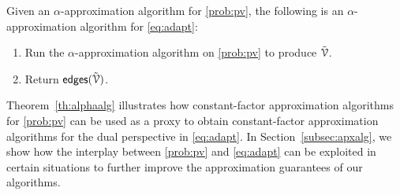 \documentclass[conference]{IEEEtran}
\begin{document}
\begin{theorem}
  \normalfont
  Given an $\alpha$-approximation algorithm for
  \ref{prob:pv}, the following is
  an $\alpha$-approximation algorithm for \ref{eq:adapt}:
  \begin{enumerate}
	\item Run the $\alpha$-approximation algorithm on \ref{prob:pv} to produce
	  $\tilde{\mathcal{V}}$.
	\item Return $\mathsf{edges}(\tilde{\mathcal{V}})$.
  \end{enumerate}
  \label{th:alphaalg}
\end{theorem}
Theorem~\ref{th:alphaalg} illustrates how constant-factor approximation
algorithms for \ref{prob:pv} can be used as a proxy to obtain constant-factor approximation
algorithms for the dual perspective in \ref{eq:adapt}.
In Section~\ref{subsec:apxalg}, we show how the interplay between \ref{prob:pv}
and \ref{eq:adapt} can be exploited in certain situations to further improve the
approximation guarantees of our algorithms.
  
\end{document}
